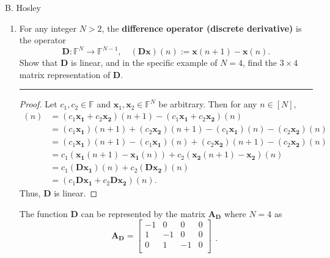 \documentclass[12pt]{amsart}
\newcommand{\1}{\mathbbm{1}}
\numberwithin{equation}{section}
\numberwithin{Theorem}{section}
\theoremstyle{plain} %
\theoremstyle{definition}
\theoremstyle{remark}
\begin{document}
\thispagestyle{empty}

\hspace{\fill} {\Large B. Hosley}
\bigskip


\begin{enumerate}[1.]



\item
For any integer $N>2$, the \textbf{difference operator (discrete derivative)} is the operator
\begin{equation*}
\mathbf{D}:\mathbb{F}^{N}\rightarrow\mathbb{F}^{N-1},\quad(\mathbf{D}\mathbf{x})(n):=\mathbf{x}(n+1)-\mathbf{x}(n).
\end{equation*}
Show that $\mathbf{D}$ is linear, and in the specific example of $N=4$, find the $3\times 4$ matrix representation of $\mathbf{D}$.

\bigskip
\hrule
\bigskip

\begin{proof}
	Let \(c_1,c_2 \in \mathbb{F}\) and \( \mathbf{x}_1, \mathbf{x}_2 \in \mathbb{F}^N \) be arbitrary.
	Then for any \(n\in [N]\),
	\begin{align*}
		[\mathbf{D}(c_1\mathbf{x_1} + c_2\mathbf{x_2})](n)
		&= (c_1\mathbf{x_1} + c_2\mathbf{x_2})(n+1) - (c_1\mathbf{x_1} + c_2\mathbf{x_2})(n) \\
		&= (c_1\mathbf{x_1})(n+1) + (c_2\mathbf{x_2})(n+1) - (c_1\mathbf{x_1})(n) - (c_2\mathbf{x_2})(n) \\
		&= (c_1\mathbf{x_1})(n+1) - (c_1\mathbf{x_1})(n) + (c_2\mathbf{x_2})(n+1) - (c_2\mathbf{x_2})(n) \\
		&= c_1(\mathbf{x_1}(n+1) - \mathbf{x_1}(n)) + c_2(\mathbf{x_2}(n+1) - \mathbf{x_2})(n) \\
		&= c_1(\mathbf{D}\mathbf{x_1})(n) + c_2(\mathbf{D}\mathbf{x_2})(n) \\
		&= (c_1\mathbf{D}\mathbf{x_1} + c_2\mathbf{D}\mathbf{x_2})(n).
	\end{align*}
	Thus, $\mathbf{D}$ is linear.
\end{proof}
The function \(\mathbf{D}\) can be represented by the matrix \(\mathbf{A_D}\) where \(N=4\) as
\[
\mathbf{A_D} = \begin{bmatrix}
	-1 & 0 & 0 & 0 \\
	1 & -1 & 0 & 0 \\
	0 & 1 & -1 & 0 \\
\end{bmatrix}
\begin{matrix}
	\\ \\ \\ .\\
\end{matrix}
\]


\end{enumerate}
\end{document}
